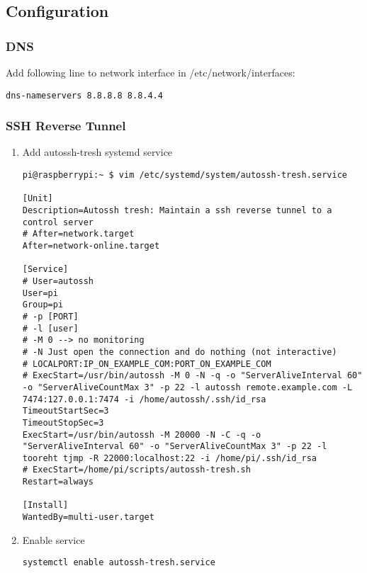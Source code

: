 \subsection*{Configuration}\label{configuration}

\subsubsection*{DNS}\label{dns}

Add following line to network interface in /etc/network/interfaces:

\begin{verbatim}
dns-nameservers 8.8.8.8 8.8.4.4
\end{verbatim}

\subsubsection*{SSH Reverse Tunnel}\label{ssh-reverse-tunnel}

\begin{enumerate}
\def\labelenumi{\arabic{enumi}.}
\item
  Add autossh-tresh systemd service

\begin{verbatim}
pi@raspberrypi:~ $ vim /etc/systemd/system/autossh-tresh.service

[Unit]
Description=Autossh tresh: Maintain a ssh reverse tunnel to a control server
# After=network.target
After=network-online.target

[Service]
# User=autossh
User=pi
Group=pi
# -p [PORT]
# -l [user]
# -M 0 --> no monitoring
# -N Just open the connection and do nothing (not interactive)
# LOCALPORT:IP_ON_EXAMPLE_COM:PORT_ON_EXAMPLE_COM
# ExecStart=/usr/bin/autossh -M 0 -N -q -o "ServerAliveInterval 60" -o "ServerAliveCountMax 3" -p 22 -l autossh remote.example.com -L 7474:127.0.0.1:7474 -i /home/autossh/.ssh/id_rsa
TimeoutStartSec=3
TimeoutStopSec=3
ExecStart=/usr/bin/autossh -M 20000 -N -C -q -o "ServerAliveInterval 60" -o "ServerAliveCountMax 3" -p 22 -l tooreht tjmp -R 22000:localhost:22 -i /home/pi/.ssh/id_rsa
# ExecStart=/home/pi/scripts/autossh-tresh.sh
Restart=always

[Install]
WantedBy=multi-user.target
\end{verbatim}
\item
  Enable service

\begin{verbatim}
systemctl enable autossh-tresh.service
\end{verbatim}
\end{enumerate}

